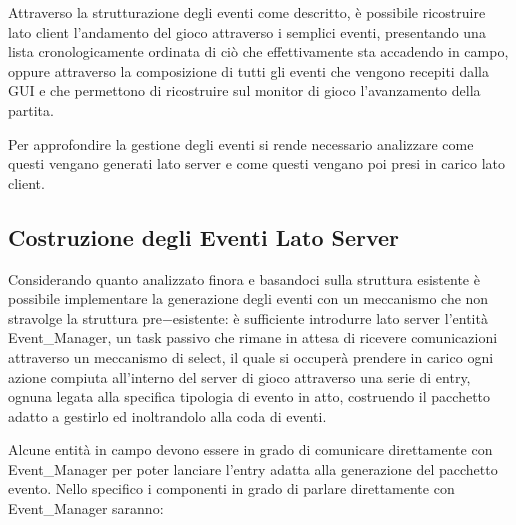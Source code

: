 \documentclass[aps,letterpaper,10pt]{article}
\begin{document}
Attraverso la strutturazione degli eventi come descritto, \`e possibile ricostruire lato client l'andamento del gioco attraverso i semplici eventi, presentando una lista cronologicamente ordinata di ci\`o che effettivamente sta accadendo in campo, oppure attraverso la composizione di tutti gli eventi che vengono recepiti dalla GUI e che permettono di ricostruire sul monitor di gioco l'avanzamento della partita. \vspace{3mm}

Per approfondire la gestione degli eventi si rende necessario analizzare come questi vengano generati lato server e come questi vengano poi presi in carico lato client.


\subsection{Costruzione degli Eventi Lato Server} %
\label{sub:costruzione_degli_eventi_lato_server}

Considerando quanto analizzato finora e basandoci sulla struttura esistente \`e possibile implementare la generazione degli eventi con un meccanismo che non stravolge la struttura pre$-$esistente: \`e sufficiente introdurre lato server l'entit\`a Event\_Manager, un task passivo che rimane in attesa di ricevere comunicazioni attraverso un meccanismo di select, il quale si occuper\`a prendere in carico ogni azione compiuta all'interno del server di gioco attraverso una serie di entry, ognuna legata alla specifica tipologia di evento in atto, costruendo il pacchetto adatto a gestirlo ed inoltrandolo alla coda di eventi. \vspace{3mm}

Alcune entit\`a in campo devono essere in grado di comunicare direttamente con Event\_Manager per poter lanciare l'entry adatta alla generazione del pacchetto evento. Nello specifico i componenti in grado di parlare direttamente con Event\_Manager saranno:
\end{document}
